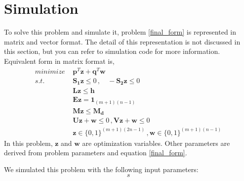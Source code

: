 \documentclass[lettersize,journal]{IEEEtran}
\begin{document}
\section{Simulation}
To solve this problem and simulate it, problem \ref{final_form} is represented in matrix and vector format. The detail of this representation is not discussed in this section, but you can refer to simulation code for more information. Equivalent form in matrix format is,
\begin{align}
\label{matrix_form}
minimize \, \, & \boldsymbol{p}^T \boldsymbol{z} + \boldsymbol{q}^T \boldsymbol{w} \\
s.t.  \, \, & \boldsymbol{S_1} \boldsymbol{z} \leq 0 \, , \quad -\boldsymbol{S_2} \boldsymbol{z} \leq 0 \nonumber \\
\quad & \boldsymbol{L}\boldsymbol{z} \leq \boldsymbol{h} \nonumber \\
\quad &  \boldsymbol{E} \boldsymbol{z} = \boldsymbol{1}_{(m+1)(n-1)}  \nonumber \\
\quad &  \boldsymbol{M} \boldsymbol{z} \leq \boldsymbol{M_d} \nonumber \\
\quad &  \boldsymbol{U} \boldsymbol{z} + \boldsymbol{w} \leq 0 \, , \boldsymbol{V} \boldsymbol{z} + \boldsymbol{w} \leq 0 \nonumber \\
\quad &  \boldsymbol{z} \in \{0, 1\}^{(m+1)(2n-1)} \, , \boldsymbol{w} \in \{0, 1\}^{(m+1)(n-1)} \nonumber
\end{align}
In this problem, $\boldsymbol{z}$ and $\boldsymbol{w}$ are optimization variables. Other parameters are derived from problem parameters and equation \ref{final_form}. 

We simulated this problem with the following input parameters:
\begin{equation}
s
\end{equation}
\end{document}
